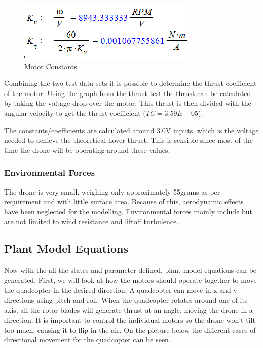 \begin{figure}[H]
\begin{center}
   \includegraphics[scale =1.5]{pictures/control/Motor constants calc.png}
\end{center}
\caption{Motor Constants}
\end{figure}

Combining the two test data sets it is possible to determine the thrust coefficient of the motor. Using the graph from the thrust test the thrust can be calculated by taking the voltage drop over the motor. This thrust is then divided with the angular velocity to get the thrust coefficient ($TC=3.59E-05$).

The constants/coefficients are calculated around 3.0V inputs, which is the voltage needed to achieve the theoretical hover thrust. This is sensible since most of the time the drone will be operating around these values. 

\subsubsection{Environmental Forces}
The drone is very small, weighing only approximately 55grams as per requirement and with little surface area. Because of this, aerodynamic effects have been neglected for the modelling. Environmental forces mainly include but are not limited to wind resistance and liftoff turbulence.

\subsection{Plant Model Equations}
Now with the all the states and parameter defined, plant model equations can be generated. 
First, we will look at how the motors should operate together to move the quadcopter in the desired direction. A quadcopter can move in x and y directions using pitch and roll. When the quadcopter rotates around one of its axis, all the rotor blades will generate thrust at an angle, moving the drone in a direction. It is important to control the individual motors so the drone won’t tilt too much, causing it to flip in the air. On the picture below the different cases of directional movement for the quadcopter can be seen.  


